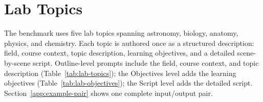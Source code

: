 %

\section{Lab Topics}
\label{app:lab-topics}

The benchmark uses five lab topics spanning astronomy, biology, anatomy,
physics, and chemistry. Each topic is authored once as a structured
description: field, course context, topic description, learning objectives,
and a detailed scene-by-scene script. Outline-level prompts include the
field, course context, and topic description (Table~\ref{tab:lab-topics}); the
Objectives level adds the learning objectives (Table~\ref{tab:lab-objectives});
the Script level adds the detailed script. Section~\ref{app:example-pair} shows one complete
input/output pair.

